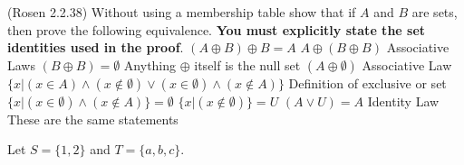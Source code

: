 \documentclass[10pt]{exam}
\begin{document}
\begin{questions}
\question[3] (Rosen 2.2.38) Without using a membership table show that if $A$ and $B$ are sets, then prove the following equivalence. \textbf{You must explicitly state the set identities used in the proof}.
\newline $(A \oplus  B) \oplus B  = A$
\newline $A \oplus (B \oplus B)$ Associative Laws
\newline $(B \oplus B) = \emptyset$ Anything $\oplus$ itself is the null set
\newline $(A \oplus \emptyset)$ Associative Law
\newline $\{x|(x\in A) \land (x\notin \emptyset) \lor (x\in \emptyset)\land(x\notin A)\}$ Definition of exclusive or set
\newline$\{x|(x\in\emptyset)\land(x\notin A)\} = \emptyset$
\newline$\{x|(x\notin \emptyset)\} = U$
\newline$(A \lor U) = A$ Identity Law
\newline These are the same statements

\question[14] Let $S = \{1, 2\}$ and $T = \{a, b, c\}$.
\end{questions}
\end{document}
